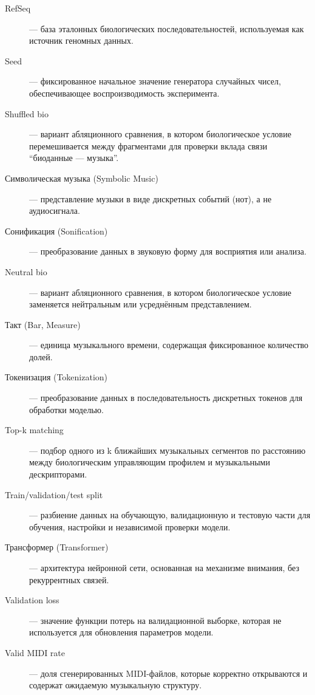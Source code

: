 \begin{description}
\item[RefSeq] — база эталонных биологических последовательностей, используемая как источник геномных данных.

\item[Seed] — фиксированное начальное значение генератора случайных чисел, обеспечивающее воспроизводимость эксперимента.

\item[Shuffled bio] — вариант абляционного сравнения, в котором биологическое условие перемешивается между фрагментами для проверки вклада связи ``биоданные — музыка''.

\item[Символическая музыка (Symbolic Music)] — представление музыки в виде дискретных событий (нот), а не аудиосигнала.

\item[Сонификация (Sonification)] — преобразование данных в звуковую форму для восприятия или анализа.

\item[Neutral bio] — вариант абляционного сравнения, в котором биологическое условие заменяется нейтральным или усреднённым представлением.

\item[Такт (Bar, Measure)] — единица музыкального времени, содержащая фиксированное количество долей.

\item[Токенизация (Tokenization)] — преобразование данных в последовательность дискретных токенов для обработки моделью.

\item[Top-k matching] — подбор одного из k ближайших музыкальных сегментов по расстоянию между биологическим управляющим профилем и музыкальными дескрипторами.

\item[Train/validation/test split] — разбиение данных на обучающую, валидационную и тестовую части для обучения, настройки и независимой проверки модели.

\item[Трансформер (Transformer)] — архитектура нейронной сети, основанная на механизме внимания, без рекуррентных связей.

\item[Validation loss] — значение функции потерь на валидационной выборке, которая не используется для обновления параметров модели.

\item[Valid MIDI rate] — доля сгенерированных MIDI-файлов, которые корректно открываются и содержат ожидаемую музыкальную структуру.


\end{description}
